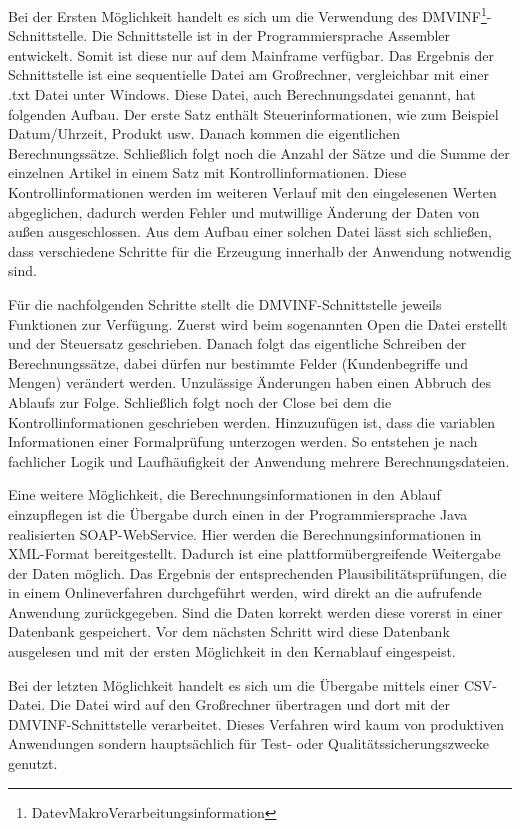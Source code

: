 Bei der Ersten Möglichkeit handelt es sich um die Verwendung des DMVINF\footnote{DatevMakroVerarbeitungsinformation}-Schnittstelle.
Die Schnittstelle ist in der Programmiersprache Assembler entwickelt.
Somit ist diese nur auf dem Mainframe verfügbar.
Das Ergebnis der Schnittstelle ist eine sequentielle Datei am Großrechner, vergleichbar mit einer .txt Datei unter Windows.
Diese Datei, auch Berechnungsdatei genannt, hat folgenden Aufbau.
Der erste Satz enthält Steuerinformationen, wie zum Beispiel Datum/Uhrzeit, Produkt usw.
Danach kommen die eigentlichen Berechnungssätze.
Schließlich folgt noch die Anzahl der Sätze und die Summe der einzelnen Artikel in einem Satz mit Kontrollinformationen.
Diese Kontrollinformationen werden im weiteren Verlauf mit den eingelesenen Werten abgeglichen, dadurch werden Fehler und mutwillige Änderung der Daten von außen ausgeschlossen.
Aus dem Aufbau einer solchen Datei lässt sich schließen, dass verschiedene Schritte für die Erzeugung innerhalb der Anwendung notwendig sind.

Für die nachfolgenden Schritte stellt die DMVINF-Schnittstelle jeweils Funktionen zur Verfügung.
Zuerst wird beim sogenannten \glqq Open\grqq{} die Datei erstellt und der Steuersatz geschrieben.
Danach folgt das eigentliche Schreiben der Berechnungssätze, dabei dürfen nur bestimmte Felder (Kundenbegriffe und Mengen) verändert werden.
Unzulässige Änderungen haben einen Abbruch des Ablaufs zur Folge.
Schließlich folgt noch der \glqq Close\grqq{} bei dem die Kontrollinformationen geschrieben werden.
Hinzuzufügen ist, dass die variablen Informationen einer Formalprüfung unterzogen werden.
So entstehen je nach fachlicher Logik und Laufhäufigkeit der Anwendung mehrere Berechnungsdateien.

Eine weitere Möglichkeit, die Berechnungsinformationen in den Ablauf einzupflegen ist die Übergabe durch einen in der Programmiersprache Java realisierten SOAP-WebService.
Hier werden die Berechnungsinformationen in XML-Format bereitgestellt.
Dadurch ist eine plattformübergreifende Weitergabe der Daten möglich.
Das Ergebnis der entsprechenden Plausibilitätsprüfungen, die in einem Onlineverfahren durchgeführt werden, wird direkt an die aufrufende Anwendung zurückgegeben.
Sind die Daten korrekt werden diese vorerst in einer Datenbank gespeichert.
Vor dem nächsten Schritt wird diese Datenbank ausgelesen und mit der ersten Möglichkeit in den Kernablauf eingespeist.

Bei der letzten Möglichkeit handelt es sich um die Übergabe mittels einer CSV-Datei.
Die Datei wird auf den Großrechner übertragen und dort mit der DMVINF-Schnittstelle verarbeitet.
Dieses Verfahren wird kaum von produktiven Anwendungen sondern hauptsächlich für Test- oder Qualitätssicherungszwecke genutzt.

